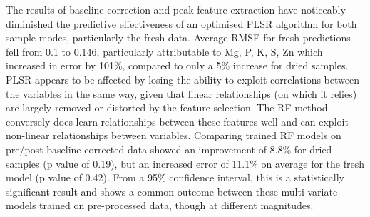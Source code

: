 \documentclass[conference]{IEEEtran}
\begin{document}
The results of baseline correction and peak feature extraction have noticeably diminished the predictive effectiveness of an optimised PLSR algorithm for both sample modes, particularly the fresh data. Average RMSE for fresh predictions fell from 0.1 to 0.146, particularly attributable to Mg, P, K, S, Zn which increased in error by 101\%, compared to only a 5\% increase for dried samples. PLSR appears to be affected by losing the ability to exploit correlations between the variables in the same way, given that linear relationships (on which it relies) are largely removed or distorted by the feature selection. The RF method conversely does learn relationships between these features well and can exploit non-linear relationships between variables. Comparing trained RF models on pre/post baseline corrected data showed an improvement of 8.8\% for dried samples (p value of 0.19), but an increased error of 11.1\% on average for the fresh model (p value of 0.42). From a 95\% confidence interval, this is a statistically significant result and shows a common outcome between these multi-variate models trained on pre-processed data, though at different magnitudes.
\end{document}
